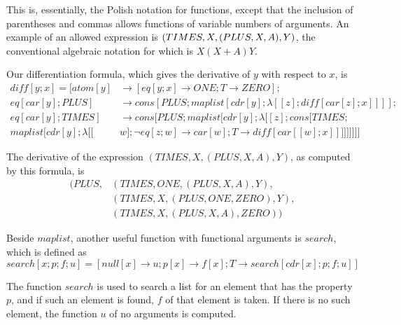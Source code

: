 \documentclass[11pt, a4paper]{article}
\begin{document}
This is, essentially, the Polish notation for functions, except that the
inclusion of parentheses and commas allows functions of variable numbers of
arguments. An example of an allowed expression is $(TIMES, X, (PLUS, X,
A),\\Y)$, the conventional algebraic notation for which is $X(X + A)Y$.

Our differentiation formula, which gives the derivative of $y$ with respect to
$x$, is
\begin{align*}
  diff[y; x] = [atom[y] &\to [eq[y; x] \to ONE; T \to ZERO];                  \\
    eq[car[y]; PLUS] &\to cons[PLUS; maplist[cdr[y]; \lambda[[z]; diff[car[z];
            x]]]];                                                            \\
    eq[car[y]; TIMES] &\to cons[PLUS; maplist[cdr[y]; \lambda[[z]; cons[TIMES;\\
maplist[cdr[y]; \lambda[[&w]; \lnot eq[z; w] \to car[w]; T \to diff[car[[w];
        x]]]]]]]]]
\end{align*}

The derivative of the expression $(TIMES, X, (PLUS, X, A), Y)$, as computed by
this formula, is
\begin{align*}
(PLUS, &(TIMES, ONE, (PLUS, X, A), Y),    \\
       &(TIMES, X, (PLUS, ONE, ZERO), Y), \\
       &(TIMES, X, (PLUS, X, A), ZERO))
\end{align*}

Beside $maplist$, another useful function with functional arguments is $search$,
which is defined as
$$ search[x; p; f; u] = [null[x] \to u; p[x] \to f[x]; T \to search[cdr[x]; p;
    f; u]] $$

The function $search$ is used to search a list for an element that has the
property $p$, and if such an element is found, $f$ of that element is taken. If
there is no such element, the function $u$ of no arguments is computed.
\end{document}
